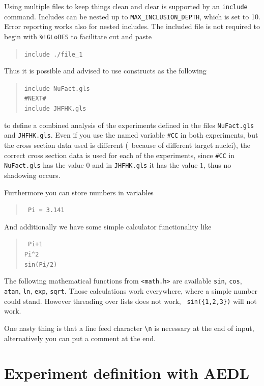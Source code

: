 Using multiple files to keep things clean and clear is supported by 
 an {\tt include} command. Includes can be nested up 
 to {\tt MAX\_INCLUSION\_DEPTH}, which is set to 10. Error reporting works 
 also for nested includes. The included file is not required to begin 
 with {\tt \%!GLoBES} to facilitate cut and paste
\begin{quote}
{\tt include ./file\_1}
\end{quote}

Thus it is possible and advised to use constructs as the following
\begin{quote}
{\tt    include NuFact.gls\\
        \#NEXT\#\\
        include JHFHK.gls
}
\end{quote}
to define a combined analysis of the experiments defined in the files 
{\tt NuFact.gls} and {\tt JHFHK.gls}. Even if you use the named 
variable {\tt \#CC} in both experiments, but the cross section data used 
is different (\eg\ because of different target nuclei), the correct 
cross section data is used for each of the experiments, since {\tt \#CC} 
in {\tt NuFact.gls} has the value $0$ and
in {\tt JHFHK.gls} it has the value $1$, thus no shadowing occurs.

Furthermore you can store numbers in variables
\begin{quote}
{\tt
Pi = 3.141
}
\end{quote}
And additionally we have some simple calculator functionality like
\begin{quote}
{\tt
Pi+1\\
\verb+Pi^2+\\
sin(Pi/2)\\
}
\end{quote}
The following mathematical functions from {\tt <math.h>} are available 
{\tt sin}, {\tt cos}, {\tt atan}, {\tt ln}, {\tt exp}, {\tt sqrt}. 
Those calculations work everywhere, where
a simple number could stand. However threading over lists does not
 work, \eg\ {\tt sin(\{1,2,3\})} will not work. 

One nasty thing is that a line feed character \verb+\n+ is necessary at
 the end of input, alternatively you can put a comment at the end.


\chapter{Experiment definition with AEDL}



